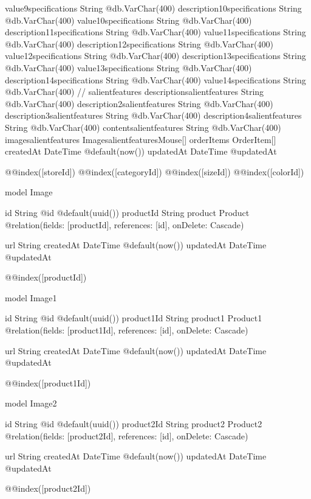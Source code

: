 {  value9specifications        String                     @db.VarChar(400)
  description10specifications String                     @db.VarChar(400)
  value10specifications       String                     @db.VarChar(400)
  description11specifications String                     @db.VarChar(400)
  value11specifications       String                     @db.VarChar(400)
  description12specifications String                     @db.VarChar(400)
  value12specifications       String                     @db.VarChar(400)
  description13specifications String                     @db.VarChar(400)
  value13specifications       String                     @db.VarChar(400)
  description14specifications String                     @db.VarChar(400)
  value14specifications       String                     @db.VarChar(400)
  // salientfeatures
  descriptionsalientfeatures  String                     @db.VarChar(400)
  description2salientfeatures String                     @db.VarChar(400)
  description3salientfeatures String                     @db.VarChar(400)
  description4salientfeatures String                     @db.VarChar(400)
  contentsalientfeatures      String                     @db.VarChar(400)
  imagesalientfeatures    ImagesalientfeaturesMouse[]
  orderItems                  OrderItem[]
  createdAt                   DateTime                   @default(now())
  updatedAt                   DateTime                   @updatedAt

  @@index([storeId])
  @@index([categoryId])
  @@index([sizeId])
  @@index([colorId])
}

model Image {
  id        String  @id @default(uuid())
  productId String
  product   Product @relation(fields: [productId], references: [id], onDelete: Cascade)

  url       String
  createdAt DateTime @default(now())
  updatedAt DateTime @updatedAt

  @@index([productId])
}

model Image1 {
  id         String   @id @default(uuid())
  product1Id String
  product1   Product1 @relation(fields: [product1Id], references: [id], onDelete: Cascade)

  url       String
  createdAt DateTime @default(now())
  updatedAt DateTime @updatedAt

  @@index([product1Id])
}

model Image2 {
  id         String   @id @default(uuid())
  product2Id String
  product2   Product2 @relation(fields: [product2Id], references: [id], onDelete: Cascade)

  url       String
  createdAt DateTime @default(now())
  updatedAt DateTime @updatedAt

  @@index([product2Id])
}

